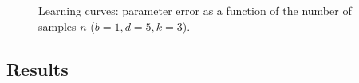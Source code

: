 
\begin{figure}[tbhp]
  \centering
    \hspace{-2em}
  \caption{Learning curves: parameter error as a function of the number of samples $n$ ($b = 1, d = 5, k = 3$).}
  \label{fig:vs-n}
\end{figure}


\subsection{Results}

